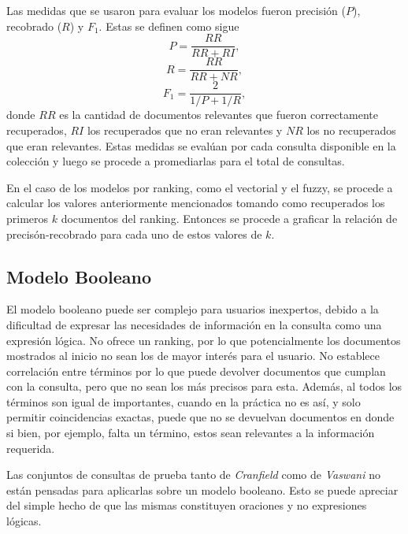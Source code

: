 \documentclass{llncs}
\begin{document}
	Las medidas que se usaron para evaluar los modelos fueron precisi\'on ($P$), recobrado ($R$) y $F_1$. Estas se definen como sigue
	\[
	P = \frac{RR}{RR + RI},
	\]
	\[
	R = \frac{RR}{RR + NR},
	\]
	\[
	F_1 = \frac{2}{1/P + 1/R},
	\]
	donde $RR$ es la cantidad de documentos relevantes que fueron correctamente recuperados, $RI$ los recuperados que no eran relevantes y $NR$ los no recuperados que eran relevantes. Estas medidas se eval\'uan por cada consulta disponible en la colecci\'on y luego se procede a promediarlas para el total de consultas.
	
	En el caso de los modelos por ranking, como el vectorial y el fuzzy, se procede a calcular los valores anteriormente mencionados tomando como recuperados los primeros $k$ documentos del ranking. Entonces se procede a graficar la relaci\'on de precis\'on-recobrado para cada uno de estos valores de $k$.
	
	\subsection{Modelo Booleano}
	
	El modelo booleano puede ser complejo para usuarios inexpertos, debido a la dificultad de expresar las necesidades de informaci\'on en la consulta como una expresi\'on l\'ogica. No ofrece un ranking, por lo que potencialmente los documentos mostrados al inicio no sean los de mayor inter\'es para el usuario. No establece correlaci\'on entre t\'erminos por lo que puede devolver documentos que cumplan con la consulta, pero que no sean los m\'as precisos para esta. Adem\'as, al todos los t\'erminos son igual de importantes, cuando en la pr\'actica no es as\'i, y solo permitir coincidencias exactas, puede que no se devuelvan documentos en donde si bien, por ejemplo, falta un t\'ermino, estos sean relevantes a la informaci\'on requerida.
	
	Las conjuntos de consultas de prueba tanto de \emph{Cranfield} como de \emph{Vaswani} no est\'an pensadas para aplicarlas sobre un modelo booleano. Esto se puede apreciar del simple hecho de que las mismas constituyen oraciones y no expresiones l\'ogicas. 
	
\end{document}
